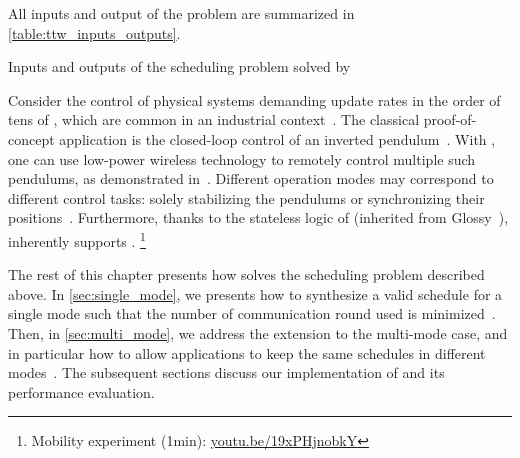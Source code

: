All inputs and output of the problem are summarized in \cref{table:ttw_inputs_outputs}.

\begin{table}
	\caption{Inputs and outputs of the scheduling problem solved by \TTW}
	\label{table:ttw_inputs_outputs}
	\smaller{}
\end{table}

Consider the control of physical systems demanding update rates in the order of tens of \ms, which are common in an industrial context~\cite{akerberg2011Future}.
The classical proof-of-concept application is the closed-loop control of an inverted pendulum~\cite{boubaker2012inverted}.
With \TTW, one can use low-power wireless technology to remotely control multiple such pendulums, as demonstrated in~\cite{mager2019Feedback}.
Different \TTW operation modes may correspond to different control tasks: \eg solely stabilizing the pendulums or synchronizing their positions~\cite{mager2019Demo}.
Furthermore, thanks to the stateless logic of \TTnet (inherited from Glossy~\cite{ferrari2011Glossy}), \TTW inherently supports .%
%
\footnote{Mobility experiment (1min): \href{https://youtu.be/19xPHjnobkY}{youtu.be/19xPHjnobkY}}

\pagebreak

The rest of this chapter presents how \TTW solves the scheduling problem described above.
In \cref{sec:single_mode}, we presents how to synthesize a valid schedule for a single mode such that the number of communication round used is minimized~.
Then, in \cref{sec:multi_mode}, we address the extension to the multi-mode case, and in particular how to allow applications to keep the same schedules in different modes~.
The subsequent sections discuss our implementation of \TTW and its performance evaluation.
